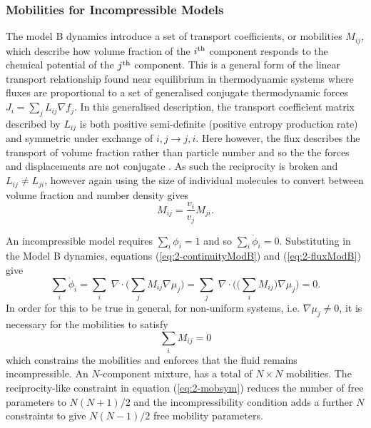\subsubsection{Mobilities for Incompressible Models} \label{subsec:mob}

The model B dynamics introduce a set of transport coefficients, or mobilities $M_{ij}$, which describe how volume fraction of the $i\textsuperscript{th}$ component responds to the chemical potential of the $j\textsuperscript{th}$ component. This is a general form of the linear transport relationship found near equilibrium in thermodynamic systems where fluxes are proportional to a set of generalised conjugate thermodynamic forces $J_i = \sum_{j}L_{ij}\nabla f_{j}$. In this generalised description, the transport coefficient matrix described by $L_{ij}$ is both positive semi-definite (positive entropy production rate) and symmetric under exchange of $i, j \rightarrow j, i$. Here however, the flux describes the transport of volume fraction rather than particle number and so the the forces and displacements are not conjugate \cite{groot_non-equilibrium_1984}. As such the reciprocity is broken and $L_{ij} \neq L_{ji}$, however again using the size of individual molecules to convert between volume fraction and number density gives
\begin{equation}
    {M}_{ij} = \frac{v_i}{v_j}{M}_{ji}.
    \label{eq:2-mobsym}
\end{equation}

An incompressible model requires $\sum_i\phi_i = 1$ and so $\sum_i\dot{\phi}_i = 0$. Substituting in the Model B dynamics, equations (\ref{eq:2-continuityModB}) and (\ref{eq:2-fluxModB}) give
\begin{equation}
    \sum_i\dot{\phi}_i = \sum_i\;\nabla\cdot\bigg(\sum_j M_{ij}\nabla\mu_j\bigg) = \sum_j\;\nabla\cdot\bigg(\big(\sum_i M_{ij}\big)\nabla\mu_j\bigg) = 0.
\end{equation}
In order for this to be true in general, for non-uniform systems, i.e. $\nabla\mu_j \neq 0$, it is necessary for the mobilities to satisfy
\begin{equation}
    \sum_i M_{ij} = 0
    \label{eq:2-mobinc}
\end{equation}
which constrains the mobilities and enforces that the fluid remains incompressible.\cite{kehr_mobility_1989} An $N$-component mixture,  has a total of $N\times N$ mobilities. The reciprocity-like constraint in equation (\ref{eq:2-mobsym}) reduces the number of free parameters to $N(N+1)/2$ and the incompressibility condition adds a further $N$ constraints to give $N(N-1)/2$ free mobility parameters.

